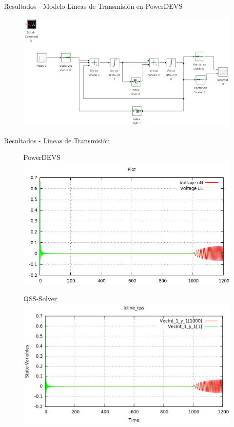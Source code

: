 \documentclass{beamer}
\begin{document}
\begin{frame}{Resultados - Modelo Líneas de Transmisión en PowerDEVS}
\begin{figure}[H]
 \includegraphics[width=\linewidth]{lclines}
\end{figure}
\end{frame}

\begin{frame}{Resultados - Líneas de Transmisión}
\begin{figure}[H]
\begin{minipage}{0.5\textwidth}
\centering
PowerDEVS\\
\includegraphics[width=\linewidth]{lcline-pd}
\end{minipage}\hfill\begin{minipage}{0.5\textwidth}
\centering
QSS-Solver\\
 \includegraphics[width=\linewidth]{lcline-qss}
\end{minipage}
\end{figure}
\end{frame}
\end{document}
